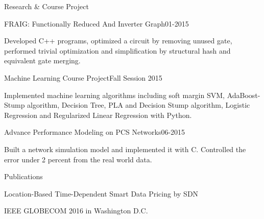 \documentclass[letterpaper]{resume} %
\begin{document}
\begin{rSection}{Research \& Course Project}

\begin{rSubsection}{FRAIG: Functionally Reduced And Inverter Graph}{01-2015}{}{}
\item Developed C++ programs, optimized a circuit by removing unused gate, performed trivial optimization and simplification by structural hash and equivalent gate merging.
\end{rSubsection}

\vspace{-0.6\baselineskip}
\begin{rSubsection}{Machine Learning Course Project}{Fall Session 2015}{}{}
\item Implemented machine learning algorithms including soft margin SVM, AdaBoost-Stump algorithm, Decision Tree, PLA and Decision Stump algorithm, Logistic Regression and Regularized Linear Regression with Python.
\end{rSubsection}
\vspace{-0.6\baselineskip}
\begin{rSubsection}{Advance Performance Modeling on PCS Networks}{06-2015}{}{}
\item Built a network simulation model and implemented it with C. Controlled the error under 2 percent from the real world data.
\end{rSubsection}

\end{rSection}
\vspace{-0.6\baselineskip}



\begin{rSection}{Publications}

\begin{rSubsection}{Location-Based Time-Dependent Smart Data Pricing by SDN}{}{}{}
\item IEEE GLOBECOM 2016 in Washington D.C.
\end{rSubsection}

\end{rSection}
\vspace{-0.6\baselineskip}
\end{document}
